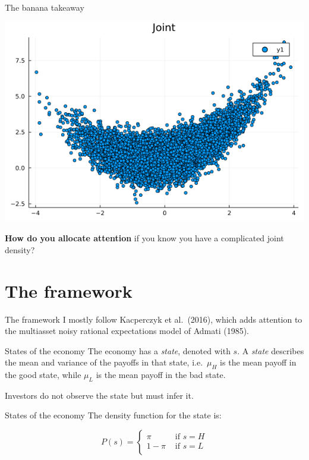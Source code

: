 \documentclass[
  ignorenonframetext,
]{beamer}
\begin{document}
\begin{frame}{The banana takeaway}
\protect\hypertarget{the-banana-takeaway}{}
\begin{center}\includegraphics[width=0.5\paperheight]{complexity_files/figure-beamer/unnamed-chunk-10-1} \end{center}

\textbf{How do you allocate attention} if you know you have a
complicated joint density?
\end{frame}

\hypertarget{the-framework}{%
\section{The framework}\label{the-framework}}

\begin{frame}{The framework}
\protect\hypertarget{the-framework-1}{}
I mostly follow Kacperczyk et al.~(2016), which adds attention to the
multiasset noisy rational expectations model of Admati (1985).
\end{frame}

\begin{frame}{States of the economy}
\protect\hypertarget{states-of-the-economy}{}
The economy has a \emph{state}, denoted with \(s\). A \emph{state}
describes the mean and variance of the payoffs in that state,
i.e.~\(\mu_H\) is the mean payoff in the good state, while \(\mu_L\) is
the mean payoff in the bad state.

Investors do not observe the state but must infer it.
\end{frame}

\begin{frame}{States of the economy}
\protect\hypertarget{states-of-the-economy-1}{}
The density function for the state is:

\[
P(s) = \begin{cases}
    \pi & \text{ if } s = H \\
    1-\pi & \text{ if } s = L \\
\end{cases}
\]
\end{frame}
\end{document}
